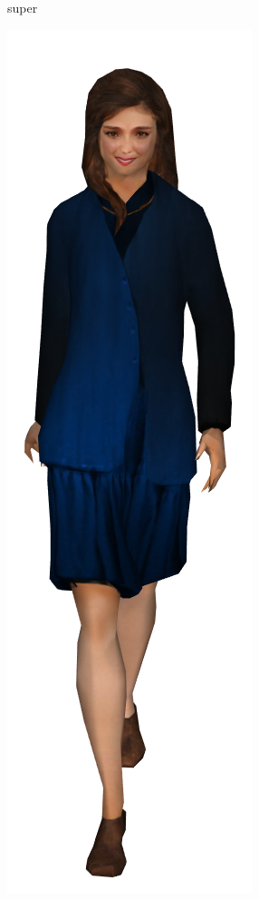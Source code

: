 \begin{figure}[h]
\begin{subfigure}[b]{.22\textwidth}
    \caption{super}
    \label{fig:womaneq0}
  \end{subfigure}%
  \begin{subfigure}[b]{.22\textwidth}
    \includegraphics[width=\textwidth]{figures/woman/equal_distance/1.png}

\end{subfigure}
\end{figure}

